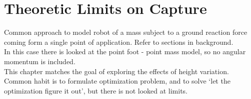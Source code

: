%
\chapter{Theoretic Limits on Capture}
Common approach to model robot of a mass subject to a ground reaction force coming form a single point of application. Refer to sections in background. \\
In this case there is looked at the point foot - point mass model, so no angular momentum is included.\\
This chapter matches the goal of exploring the effects of height variation.\\
Common habit is to formulate optimization problem, and to solve `let the optimization figure it out', but there is not looked at limits.\\


